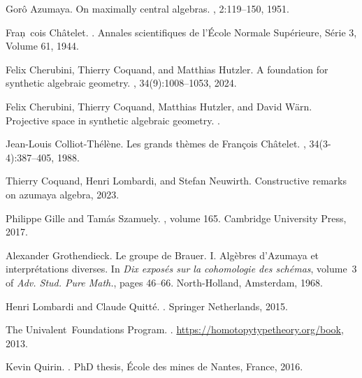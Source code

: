 \documentclass[10pt,a4paper]{article}
\theoremstyle{definition}
\begin{document}
\begin{thebibliography}{10}

Gor\^o Azumaya.
\newblock On maximally central algebras.
, 2:119--150, 1951.

Fran\c~cois Ch\^atelet.
.
\newblock Annales scientifiques de l'\'Ecole Normale Sup\'erieure, S\'erie 3,
  Volume 61, 1944.

Felix {Cherubini}, Thierry {Coquand}, and Matthias {Hutzler}.
\newblock A foundation for synthetic algebraic geometry.
, 34(9):1008--1053,
  2024.

Felix Cherubini, Thierry Coquand, Matthias Hutzler, and David Wärn.
\newblock Projective space in synthetic algebraic geometry.
.

Jean-Louis Colliot-Th\'el\`ene.
\newblock Les grands th\`emes de {F}ran\c cois {C}h\^atelet.
, 34(3-4):387--405, 1988.

Thierry Coquand, Henri Lombardi, and Stefan Neuwirth.
\newblock Constructive remarks on azumaya algebra, 2023.

Philippe Gille and Tam{\'a}s Szamuely.
, volume 165.
\newblock Cambridge University Press, 2017.

Alexander Grothendieck.
\newblock Le groupe de {B}rauer. {I}. {A}lg\`ebres d'{A}zumaya et
  interpr\'etations diverses.
\newblock In {\em Dix expos\'es sur la cohomologie des sch\'emas}, volume~3 of
  {\em Adv. Stud. Pure Math.}, pages 46--66. North-Holland, Amsterdam, 1968.

Henri Lombardi and Claude Quitt{\'{e}}.
.
\newblock Springer Netherlands, 2015.

The Univalent~Foundations Program.
.
\newblock \url{https://homotopytypetheory.org/book}, 2013.

Kevin Quirin.
.
\newblock PhD thesis, {\'{E}}cole des mines de Nantes, France, 2016.


\end{thebibliography}
\end{document}
